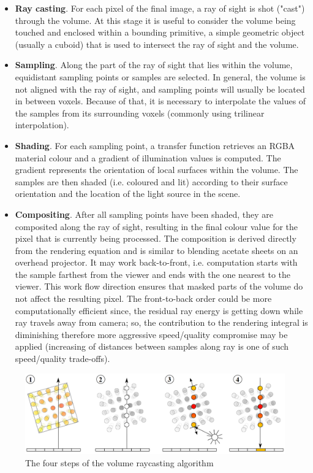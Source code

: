 \begin{itemize}

\item \textbf{Ray casting}. For each pixel of the final image, a ray of sight is shot ("cast") through the volume. At this stage it is useful to consider the volume being touched and enclosed within a bounding primitive, a simple geometric object (usually a cuboid) that is used to intersect the ray of sight and the volume.

\item \textbf{Sampling}. Along the part of the ray of sight that lies within the volume, equidistant sampling points or samples are selected. In general, the volume is not aligned with the ray of sight, and sampling points will usually be located in between voxels. Because of that, it is necessary to interpolate the values of the samples from its surrounding voxels (commonly using trilinear interpolation).

\item \textbf{Shading}. For each sampling point, a transfer function retrieves an RGBA material colour and a gradient of illumination values is computed. The gradient represents the orientation of local surfaces within the volume. The samples are then shaded (i.e. coloured and lit) according to their surface orientation and the location of the light source in the scene.

\item \textbf{Compositing}. After all sampling points have been shaded, they are composited along the ray of sight, resulting in the final colour value for the pixel that is currently being processed. The composition is derived directly from the rendering equation and is similar to blending acetate sheets on an overhead projector. It may work back-to-front, i.e. computation starts with the sample farthest from the viewer and ends with the one nearest to the viewer. This work flow direction ensures that masked parts of the volume do not affect the resulting pixel. The front-to-back order could be more computationally efficient since, the residual ray energy is getting down while ray travels away from camera; so, the contribution to the rendering integral is diminishing therefore more aggressive speed/quality compromise may be applied (increasing of distances between samples along ray is one of such speed/quality trade-offs).

\end{itemize}

\begin{figure}[th]
\centering
\includegraphics[width=\textwidth]{Figures/raycasting}
\decoRule
\caption[Volume raycasting]{ The four steps of the volume raycasting algorithm  }
\label{fig:rayasting}
\end{figure}

